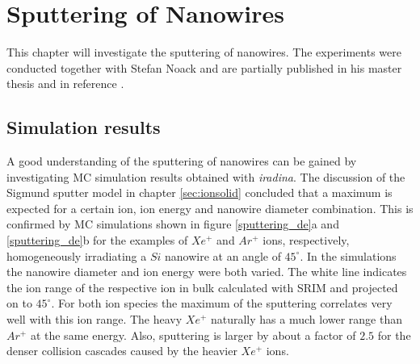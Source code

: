 \chapter{Sputtering of Nanowires}

This chapter will investigate the sputtering of nanowires. The experiments were conducted together with Stefan Noack and are partially published in his master thesis \cite{noack_sputter_2014} and in reference \cite{johannes_anomalous_2015}.




\section{Simulation results}
\label{sec:simsputering}

A good understanding of the sputtering of nanowires can be gained by investigating MC simulation results obtained with \emph{iradina}. The discussion of the Sigmund sputter model in chapter \ref{sec:ionsolid} concluded that a maximum is expected for a certain ion, ion energy and nanowire diameter combination. This is confirmed by MC simulations shown in figure \ref{sputtering_de}a and \ref{sputtering_de}b for the examples of $Xe^+$ and $Ar^+$ ions, respectively, homogeneously irradiating a $Si$ nanowire at an angle of $45^\circ$. In the simulations the nanowire diameter and ion energy were both varied. The white line indicates the ion range of the respective ion in bulk calculated with SRIM and projected on to $45^\circ$. For both ion species the maximum of the sputtering correlates very well with this ion range. The heavy $Xe^+$ naturally has a much lower range than $Ar^+$ at the same energy. Also, sputtering is larger by about a factor of $2.5$ for the denser collision cascades caused by the heavier $Xe^+$ ions.

